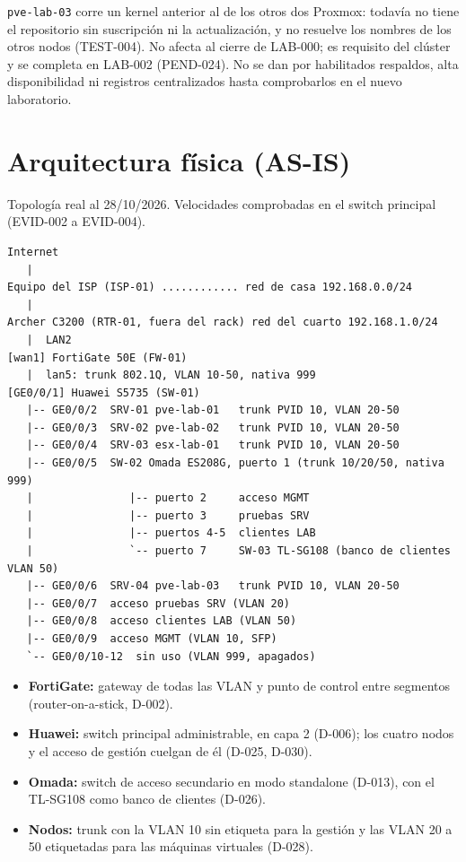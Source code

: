 \documentclass[11pt,a4paper]{article}
\begin{document}
\texttt{pve-lab-03} corre un kernel anterior al de los otros dos Proxmox: todavía no tiene el repositorio sin suscripción ni la actualización, y no resuelve los nombres de los otros nodos (TEST-004). No afecta al cierre de LAB-000; es requisito del clúster y se completa en LAB-002 (PEND-024). No se dan por habilitados respaldos, alta disponibilidad ni registros centralizados hasta comprobarlos en el nuevo laboratorio.

\clearpage
\section{Arquitectura física (AS-IS)}
Topología real al 28/10/2026. Velocidades comprobadas en el switch principal (EVID-002 a EVID-004).

\begin{lstlisting}
Internet
   |
Equipo del ISP (ISP-01) ............ red de casa 192.168.0.0/24
   |
Archer C3200 (RTR-01, fuera del rack) red del cuarto 192.168.1.0/24
   |  LAN2
[wan1] FortiGate 50E (FW-01)
   |  lan5: trunk 802.1Q, VLAN 10-50, nativa 999
[GE0/0/1] Huawei S5735 (SW-01)
   |-- GE0/0/2  SRV-01 pve-lab-01   trunk PVID 10, VLAN 20-50
   |-- GE0/0/3  SRV-02 pve-lab-02   trunk PVID 10, VLAN 20-50
   |-- GE0/0/4  SRV-03 esx-lab-01   trunk PVID 10, VLAN 20-50
   |-- GE0/0/5  SW-02 Omada ES208G, puerto 1 (trunk 10/20/50, nativa 999)
   |               |-- puerto 2     acceso MGMT
   |               |-- puerto 3     pruebas SRV
   |               |-- puertos 4-5  clientes LAB
   |               `-- puerto 7     SW-03 TL-SG108 (banco de clientes VLAN 50)
   |-- GE0/0/6  SRV-04 pve-lab-03   trunk PVID 10, VLAN 20-50
   |-- GE0/0/7  acceso pruebas SRV (VLAN 20)
   |-- GE0/0/8  acceso clientes LAB (VLAN 50)
   |-- GE0/0/9  acceso MGMT (VLAN 10, SFP)
   `-- GE0/0/10-12  sin uso (VLAN 999, apagados)
\end{lstlisting}

\begin{itemize}
  \item \textbf{FortiGate:} gateway de todas las VLAN y punto de control entre segmentos (router-on-a-stick, D-002).
  \item \textbf{Huawei:} switch principal administrable, en capa 2 (D-006); los cuatro nodos y el acceso de gestión cuelgan de él (D-025, D-030).
  \item \textbf{Omada:} switch de acceso secundario en modo standalone (D-013), con el TL-SG108 como banco de clientes (D-026).
  \item \textbf{Nodos:} trunk con la VLAN 10 sin etiqueta para la gestión y las VLAN 20 a 50 etiquetadas para las máquinas virtuales (D-028).
\end{itemize}
\end{document}
